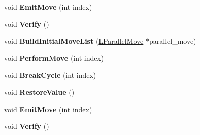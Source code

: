 \begin{DoxyCompactItemize}
\item 
void {\bfseries Emit\+Move} (int index)\hypertarget{classv8_1_1internal_1_1_b_a_s_e___e_m_b_e_d_d_e_d_a50988d2a86b49713575ec93e3c922dcf}{}\label{classv8_1_1internal_1_1_b_a_s_e___e_m_b_e_d_d_e_d_a50988d2a86b49713575ec93e3c922dcf}

\item 
void {\bfseries Verify} ()\hypertarget{classv8_1_1internal_1_1_b_a_s_e___e_m_b_e_d_d_e_d_a46f1b6e1093c631ee3b7dfca3abc94e9}{}\label{classv8_1_1internal_1_1_b_a_s_e___e_m_b_e_d_d_e_d_a46f1b6e1093c631ee3b7dfca3abc94e9}

\item 
void {\bfseries Build\+Initial\+Move\+List} (\hyperlink{classv8_1_1internal_1_1_l_parallel_move}{L\+Parallel\+Move} $\ast$parallel\+\_\+move)\hypertarget{classv8_1_1internal_1_1_b_a_s_e___e_m_b_e_d_d_e_d_a18e46b4919bd34c5ff192a955f86238d}{}\label{classv8_1_1internal_1_1_b_a_s_e___e_m_b_e_d_d_e_d_a18e46b4919bd34c5ff192a955f86238d}

\item 
void {\bfseries Perform\+Move} (int index)\hypertarget{classv8_1_1internal_1_1_b_a_s_e___e_m_b_e_d_d_e_d_a01fea4beaf81ccc3a326c14fdda8a2aa}{}\label{classv8_1_1internal_1_1_b_a_s_e___e_m_b_e_d_d_e_d_a01fea4beaf81ccc3a326c14fdda8a2aa}

\item 
void {\bfseries Break\+Cycle} (int index)\hypertarget{classv8_1_1internal_1_1_b_a_s_e___e_m_b_e_d_d_e_d_a5de6146d54eea60dd1d47b73b51a4905}{}\label{classv8_1_1internal_1_1_b_a_s_e___e_m_b_e_d_d_e_d_a5de6146d54eea60dd1d47b73b51a4905}

\item 
void {\bfseries Restore\+Value} ()\hypertarget{classv8_1_1internal_1_1_b_a_s_e___e_m_b_e_d_d_e_d_a5dca5ddf8849980c4195449ae562e8b9}{}\label{classv8_1_1internal_1_1_b_a_s_e___e_m_b_e_d_d_e_d_a5dca5ddf8849980c4195449ae562e8b9}

\item 
void {\bfseries Emit\+Move} (int index)\hypertarget{classv8_1_1internal_1_1_b_a_s_e___e_m_b_e_d_d_e_d_a50988d2a86b49713575ec93e3c922dcf}{}\label{classv8_1_1internal_1_1_b_a_s_e___e_m_b_e_d_d_e_d_a50988d2a86b49713575ec93e3c922dcf}

\item 
void {\bfseries Verify} ()\hypertarget{classv8_1_1internal_1_1_b_a_s_e___e_m_b_e_d_d_e_d_a46f1b6e1093c631ee3b7dfca3abc94e9}{}\label{classv8_1_1internal_1_1_b_a_s_e___e_m_b_e_d_d_e_d_a46f1b6e1093c631ee3b7dfca3abc94e9}


\end{DoxyCompactItemize}
